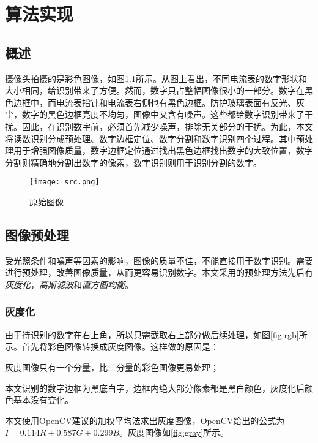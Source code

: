 
\chapter{算法实现}

\section{概述}

摄像头拍摄的是彩色图像，如图\ref{fig:src}所示。从图上看出，不同电流表的数字形状和大小相同，给识别带来了方便。然而，数字只占整幅图像很小的一部分。数字在黑色边框中，而电流表指针和电流表右侧也有黑色边框。防护玻璃表面有反光、灰尘，数字的黑色边框亮度不均匀，图像中又含有噪声。这些都给数字识别带来了干扰。因此，在识别数字前，必须首先减少噪声，排除无关部分的干扰。为此，本文将读数识别分成预处理、数字边框定位、数字分割和数字识别四个过程。其中预处理用于增强图像质量，数字边框定位通过找出黑色边框找出数字的大致位置，数字分割则精确地分割出数字的像素，数字识别则用于识别分割的数字。

\begin{figure}[h]
  \centering
  \texttt{[image: src.png]}
  \caption{原始图像}
  \label{fig:src}
\end{figure}

\section{图像预处理}

受光照条件和噪声等因素的影响，图像的质量不佳，不能直接用于数字识别。需要进行预处理，改善图像质量，从而更容易识别数字。本文采用的预处理方法先后有\emph{灰度化}，\emph{高斯滤波}和\emph{直方图均衡}。

\subsection{灰度化}



由于待识别的数字在右上角，所以只需截取右上部分做后续处理，如图\ref{fig:rgb}所示。首先将彩色图像转换成灰度图像。这样做的原因是：
\begin{asparaenum}[(1)]
\item 灰度图像只有一个分量，比三分量的彩色图像更易处理；
\item 本文识别的数字边框为黑底白字，边框内绝大部分像素都是黑白颜色，灰度化后颜色基本没有变化。
\end{asparaenum}

本文使用OpenCV建议的加权平均法求出灰度图像，OpenCV给出的公式为$I=0.114R+0.587G+0.299B$。灰度图像如\ref{fig:gray}所示。

